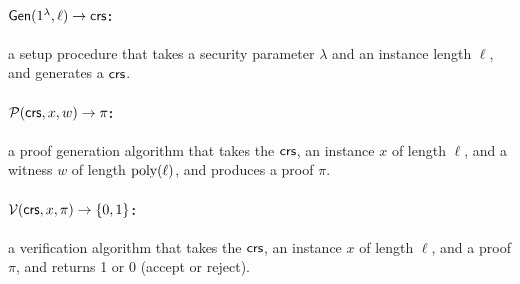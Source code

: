 \paragraph{$\mathsf{Gen}(1^\lambda, \ell)\to \mathsf{crs}$:} a setup procedure that takes a security parameter $\lambda$
		and an instance length $\ell$, and generates a $\mathsf{crs}$.
\vspace{-1ex}
\paragraph{$\mathcal{P}(\mathsf{crs}, x, w)\to \pi$:} a proof generation algorithm that takes the $\mathsf{crs}$, an instance $x$ of length $\ell$,
		and a witness $w$ of length $\operatorname{poly}(\ell)$,
		and produces a proof $\pi$.
\vspace{-1ex}
\paragraph{$\mathcal{V}(\mathsf{crs}, x, \pi)\to \left \{{0,1} \right \}$:} a verification algorithm that takes the $\mathsf{crs}$, an instance $x$ of length $\ell$,
		and a proof $\pi$, and returns 1 or 0 (accept or reject).
